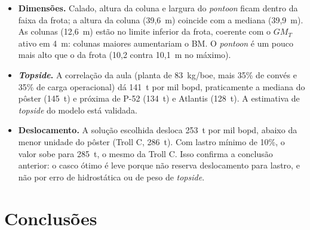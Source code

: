 \documentclass[11pt,a4paper]{article}
\begin{document}
\begin{itemize}
\item \textbf{Dimensões.} Calado, altura da coluna e largura do \emph{pontoon} ficam dentro da
faixa da frota; a altura da coluna (39,6~m) coincide com a mediana (39,9~m). As colunas
(12,6~m) estão no limite inferior da frota, coerente com o $GM_T$ ativo em 4~m: colunas maiores
aumentariam o BM. O \emph{pontoon} é um pouco mais alto que o da frota (10,2 contra 10,1~m no
máximo).
\item \textbf{\emph{Topside}.} A correlação da aula (planta de 83~kg/boe, mais 35\% de convés e 35\%
de carga operacional) dá 141~t por mil bopd, praticamente a mediana do pôster (145~t) e próxima
de P-52 (134~t) e Atlantis (128~t). A estimativa de \emph{topside} do modelo está validada.
\item \textbf{Deslocamento.} A solução escolhida desloca 253~t por mil bopd, abaixo da menor
unidade do pôster (Troll C, 286~t). Com lastro mínimo de 10\%, o valor sobe para 285~t, o mesmo
da Troll C. Isso confirma a conclusão anterior: o casco ótimo é leve porque não reserva
deslocamento para lastro, e não por erro de hidrostática ou de peso de \emph{topside}.
\end{itemize}

\section{Conclusões}
\end{document}
